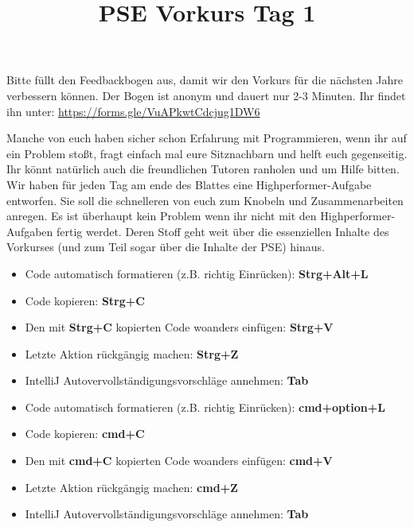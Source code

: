 \documentclass{../../sheet}
\title{PSE Vorkurs Tag 1}
\begin{document}
\maketitle

Bitte füllt den Feedbackbogen aus, damit wir den Vorkurs für die nächsten Jahre verbessern können. Der Bogen ist anonym und dauert nur 2-3 Minuten. \newline Ihr findet ihn unter: \url{https://forms.gle/VuAPkwtCdcjug1DW6}

Manche von euch haben sicher schon Erfahrung mit Programmieren, wenn ihr auf ein Problem stoßt, fragt einfach mal eure Sitznachbarn und helft euch gegenseitig. Ihr könnt natürlich auch die freundlichen Tutoren ranholen und um Hilfe bitten.
Wir haben für jeden Tag am ende des Blattes eine Highperformer-Aufgabe entworfen. Sie soll die schnelleren von euch zum Knobeln und Zusammenarbeiten anregen. Es ist überhaupt kein Problem wenn ihr nicht mit den Highperformer-Aufgaben fertig werdet. Deren Stoff geht weit über die essenziellen Inhalte des Vorkurses (und zum Teil sogar über die Inhalte der PSE) hinaus.


\begin{itemize}
  \item Code automatisch formatieren (z.B. richtig Einrücken): \textbf{Strg+Alt+L}
  \item Code kopieren: \textbf{Strg+C}
  \item Den mit \textbf{Strg+C} kopierten Code woanders einfügen: \textbf{Strg+V}
  \item Letzte Aktion rückgängig machen: \textbf{Strg+Z}
  \item IntelliJ Autovervollständigungsvorschläge annehmen: \textbf{Tab}
\end{itemize}

\begin{itemize}
  \item Code automatisch formatieren (z.B. richtig Einrücken): \textbf{cmd+option+L}
  \item Code kopieren: \textbf{cmd+C}
  \item Den mit \textbf{cmd+C} kopierten Code woanders einfügen: \textbf{cmd+V}
  \item Letzte Aktion rückgängig machen: \textbf{cmd+Z}
  \item IntelliJ Autovervollständigungsvorschläge annehmen: \textbf{Tab}
\end{itemize}
\end{document}
